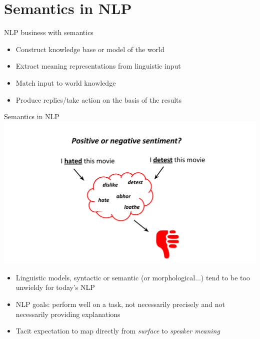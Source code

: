 \documentclass{beamer}
\begin{document}
\section{Semantics in NLP}

\begin{frame}{NLP business with semantics}
  \begin{itemize}
  \item Construct knowledge base or model of the world
  \item Extract meaning representations from linguistic input
  \item Match input to world knowledge
  \item Produce replies/take action on the basis of the results
  \end{itemize}
\end{frame}


\begin{frame}{Semantics in NLP}
  \includegraphics[height=0.5\textheight]{figures/sentiment}
  \vspace{0.4cm}
  
  \begin{itemize}
  \item Linguistic models, syntactic or semantic (or morphological...)
    tend to be too unwieldy for today's NLP
  \item NLP goals: perform well on a task, not necessarily precisely
    and not necessarily providing explanations
  \item Tacit expectation to map directly from {\it surface} to {\it
      speaker meaning}
  \end{itemize}
\end{frame}
\end{document}
